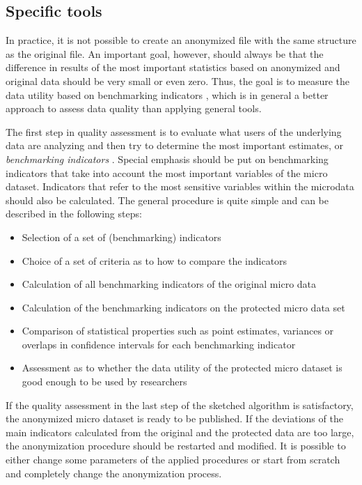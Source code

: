 \documentclass[12pt]{scrartcl}\usepackage[]{graphicx}\usepackage[]{color}
\begin{document}
\subsection{Specific tools} \label{utilityT}
In practice, it is not possible to create an anonymized file with the same structure as the original file. An important goal, however, should always be that the difference in results of the most important statistics based on anonymized and original data should be very small or even zero. Thus, the goal is to measure the data utility based on benchmarking indicators \citep{ichim10,templ11ses}, which is in general a better approach to assess data quality than applying general tools.

The first step in quality assessment is to evaluate what users of the underlying data are analyzing and then try to determine the most important estimates, or \textit{benchmarking indicators} \citep[see, e.g.,][]{templ11unece,templ11ses}. Special emphasis should be put on benchmarking indicators that take into account the most important variables of the micro dataset. Indicators that refer to the most sensitive variables within the microdata should also be calculated. The general procedure is quite simple and can be described in the following steps:

\begin{itemize}
\item Selection of a set of (benchmarking) indicators
\item Choice of a set of criteria as to how to compare the indicators
\item Calculation of all benchmarking indicators of the original micro data
\item Calculation of the benchmarking indicators on the protected micro data set
\item Comparison of statistical properties such as point estimates, variances or overlaps in confidence intervals for each benchmarking indicator
\item Assessment as to whether the data utility of the protected micro dataset is good enough to be used by researchers
\end{itemize}

If the quality assessment in the last step of the sketched algorithm is satisfactory, the anonymized micro dataset is ready to be published. If the deviations of the main indicators calculated from the original and the protected data are too large, the anonymization procedure should be restarted and modified. It is possible to either change some parameters of the applied procedures or start from scratch and completely change the anonymization process.
\end{document}
